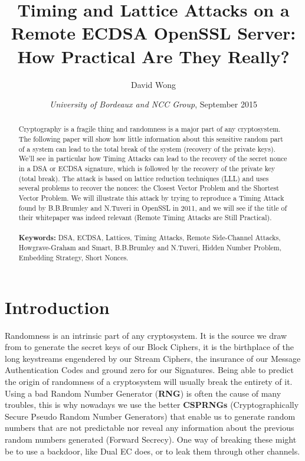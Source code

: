 \documentclass[a4paper,11pt]{article}
\title{Timing and Lattice Attacks on a Remote ECDSA OpenSSL Server: How Practical Are They Really?}
\author{David Wong}
\date{\emph{University of Bordeaux and NCC Group}, \small{September 2015}}
\begin{document}
\maketitle

\renewcommand{\abstractname}{Abstract}
\begin{abstract}
Cryptography is a fragile thing and randomness is a major part of any cryptosystem. The following paper will show how little information about this sensitive random part of a system can lead to the total break of the system (recovery of the private keys). We'll see in particular how Timing Attacks can lead to the recovery of the secret nonce in a DSA or ECDSA signature, which is followed by the recovery of the private key (total break). The attack is based on lattice reduction techniques (LLL) and uses several problems to recover the nonces: the Closest Vector Problem and the Shortest Vector Problem. We will illustrate this attack by trying to reproduce a Timing Attack found by B.B.Brumley and N.Tuveri in OpenSSL in 2011, and we will see if the title of their whitepaper was indeed relevant (Remote Timing Attacks are Still Practical).\\
\\
\textbf{Keywords:} DSA, ECDSA, Lattices, Timing Attacks, Remote Side-Channel Attacks, Howgrave-Graham and Smart, B.B.Brumley and N.Tuveri, Hidden Number Problem, Embedding Strategy, Short Nonces.\\

\end{abstract}

\section{Introduction}\label{introduction}

Randomness is an intrinsic part of any cryptosystem. It is the source we draw from to generate the secret keys of our Block Ciphers, it is the birthplace of the long keystreams engendered by our Stream Ciphers, the insurance of our Message Authentication Codes and ground zero for our Signatures. Being able to predict the origin of randomness of a cryptosystem will usually break the entirety of it. Using a bad Random Number Generator (\textbf{RNG}) is often the cause of many troubles, this is why nowadays we use the better \textbf{CSPRNGs} (Cryptographically Secure Pseudo Random Number Generators) that enable us to generate random numbers that are not predictable nor reveal any information about the previous random numbers generated (Forward Secrecy). One way of breaking these might be to use a backdoor, like Dual EC\cite{dualec} does, or to leak them through other channels.
\end{document}
